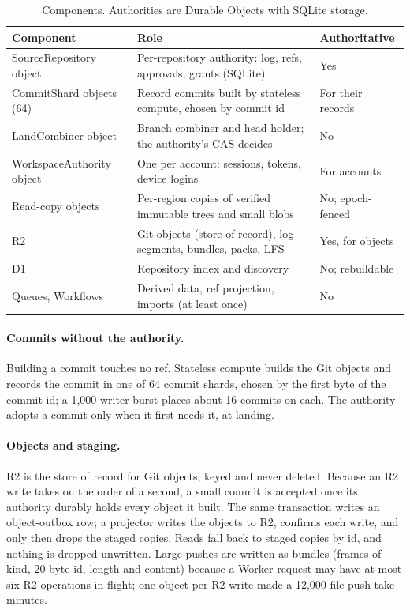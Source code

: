 \documentclass[11pt]{article}
\begin{document}
\begin{table}[t]
\centering
\small
\begin{tabularx}{\linewidth}{@{}lXl@{}}
\toprule
Component & Role & Authoritative \\
\midrule
SourceRepository object & Per-repository authority: log, refs, approvals, grants (SQLite) & Yes \\
CommitShard objects (64) & Record commits built by stateless compute, chosen by commit id & For their records \\
LandCombiner object & Branch combiner and head holder; the authority's CAS decides & No \\
WorkspaceAuthority object & One per account: sessions, tokens, device logins & For accounts \\
Read-copy objects & Per-region copies of verified immutable trees and small blobs & No; epoch-fenced \\
R2 & Git objects (store of record), log segments, bundles, packs, LFS & Yes, for objects \\
D1 & Repository index and discovery & No; rebuildable \\
Queues, Workflows & Derived data, ref projection, imports (at least once) & No \\
\bottomrule
\end{tabularx}
\caption{Components. Authorities are Durable Objects with SQLite storage.}
\label{tab:components}
\end{table}

\paragraph{Commits without the authority.} Building a commit touches no ref. Stateless
compute builds the Git objects and records the commit in one of 64 commit shards,
chosen by the first byte of the commit id; a 1,000-writer burst places about 16 commits
on each. The authority adopts a commit only when it first needs it, at landing.

\paragraph{Objects and staging.} R2 is the store of record for Git objects, keyed
 and never deleted. Because an R2 write takes on the
order of a second, a small commit is accepted once its authority durably holds every
object it built. The same transaction writes an object-outbox row; a projector writes
the objects to R2, confirms each write, and only then drops the staged copies. Reads fall
back to staged copies by id, and nothing is dropped unwritten. Large pushes are written as bundles (frames of kind, 20-byte id,
length and content) because a Worker request may have at most six R2 operations in
flight; one object per R2 write made a 12,000-file push take minutes.
\end{document}
